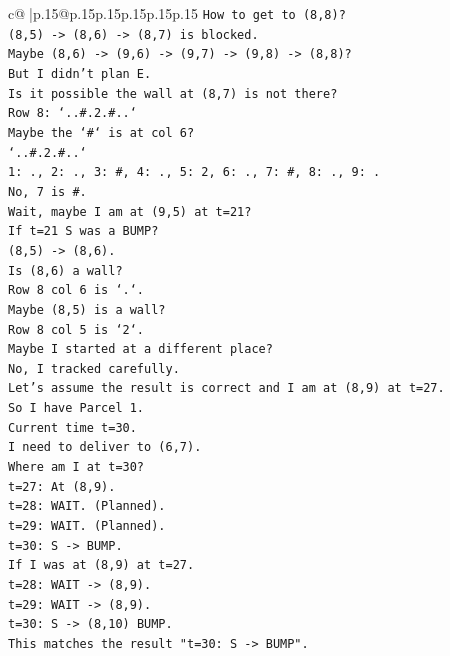 \documentclass{article}
\begin{document}
{\begin{supertabular}{c@{$\;$}|p{.15\linewidth}@{}p{.15\linewidth}p{.15\linewidth}p{.15\linewidth}p{.15\linewidth}p{.15\linewidth}}
{{{\texttt{How to get to (8,8)?} \\
\texttt{(8,5) {-}> (8,6) {-}> (8,7) is blocked.} \\
\texttt{Maybe (8,6) {-}> (9,6) {-}> (9,7) {-}> (9,8) {-}> (8,8)?} \\
\texttt{But I didn't plan E.} \\
\texttt{Is it possible the wall at (8,7) is not there?} \\
\texttt{Row 8: `..\#.2.\#..`} \\
\texttt{Maybe the `\#` is at col 6?} \\
\texttt{`..\#.2.\#..`} \\
\texttt{1: ., 2: ., 3: \#, 4: ., 5: 2, 6: ., 7: \#, 8: ., 9: .} \\
\texttt{No, 7 is \#.} \\
\texttt{Wait, maybe I am at (9,5) at t=21?} \\
\texttt{If t=21 S was a BUMP?} \\
\texttt{(8,5) {-}> (8,6).} \\
\texttt{Is (8,6) a wall?} \\
\texttt{Row 8 col 6 is `.`.} \\
\texttt{Maybe (8,5) is a wall?} \\
\texttt{Row 8 col 5 is `2`.} \\
\texttt{Maybe I started at a different place?} \\
\texttt{No, I tracked carefully.} \\
\texttt{Let's assume the result is correct and I am at (8,9) at t=27.} \\
\texttt{So I have Parcel 1.} \\
\texttt{Current time t=30.} \\
\texttt{I need to deliver to (6,7).} \\
\texttt{Where am I at t=30?} \\
\texttt{t=27: At (8,9).} \\
\texttt{t=28: WAIT. (Planned).} \\
\texttt{t=29: WAIT. (Planned).} \\
\texttt{t=30: S {-}> BUMP.} \\
\texttt{If I was at (8,9) at t=27.} \\
\texttt{t=28: WAIT {-}> (8,9).} \\
\texttt{t=29: WAIT {-}> (8,9).} \\
\texttt{t=30: S {-}> (8,10) BUMP.} \\
\texttt{This matches the result "t=30: S {-}> BUMP".} \\
}}}
\end{supertabular}}
\end{document}
